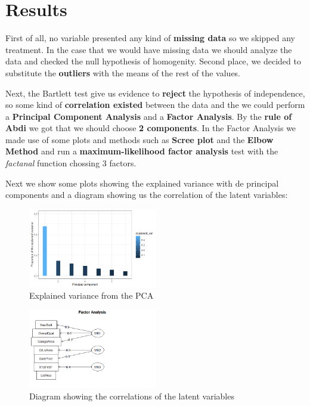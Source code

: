 \documentclass[12pt]{article}
\begin{document}
{\section{Results}
    First of all, no variable presented any kind of \textbf{missing data} so we skipped any treatment. In the case that we would have missing data we should analyze the data and checked the null hypothesis of homogenity. Second place, we decided to substitute the \textbf{outliers} with the means of the rest of the values.


    Next, the Bartlett test give us evidence to \textbf{reject} the hypothesis of independence, so some kind of \textbf{correlation existed} between the data and the we could perform a \textbf{Principal Component Analysis} and a \textbf{Factor Analysis}. By the \textbf{rule of Abdi} we got that we should choose \textbf{2 components}. In the Factor Analysis we made use of some plots and methods such as \textbf{Scree plot} and the \textbf{Elbow Method} and run a \textbf{maximum-likelihood factor analysis} test with the \textit{factanal} function chossing 3 factors.


    Next we show some plots showing the explained variance with de principal components and a diagram showing us the correlation of the latent variables:
    \begin{figure}[h]
        \centering
        \includegraphics[width=0.5\textwidth]{varianza.png}
        \caption{Explained variance from the PCA}
        \label{fig:variance}
    \end{figure}
    \begin{figure}[h]
        \centering
        \includegraphics[width=0.5\textwidth]{diagrama.png}
        \caption{Diagram showing the correlations of the latent variables}
        \label{fig:diagram}
    \end{figure}

}
\end{document}

